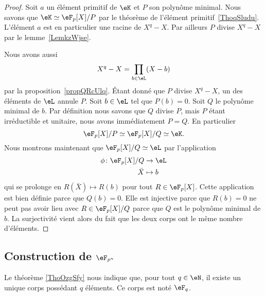 \begin{proof}
	Soit \( a\) un élément primitif de \( \eK\) et \( P\) son polynôme minimal. Nous savons que \( \eK\simeq \eF_p[X]/P\) par le théorème de l'élément primitif~\ref{ThoqSludu}. L'élément \( a\) est en particulier une racine de \( X^q-X\). Par ailleurs \( P\) divise \( X^q-X\) par le lemme~\ref{LemkzWjse}.

	Nous avons aussi
	\begin{equation}
		X^q-X=\prod_{b\in \eL}(X-b)
	\end{equation}
	par la proposition~\ref{propQRcUlq}. Étant donné que \( P\) divise \( X^q-X\), un des éléments de \( \eL\) annule \( P\). Soit \( b\in \eL\) tel que \( P(b)=0\). Soit \( Q\) le polynôme minimal de \( b\). Par définition nous savons que \( Q\) divise \( P\), mais \( P\) étant irréductible et unitaire, nous avons immédiatement \( P=Q\). En particulier
	\begin{equation}
		\eF_p[X]/P\simeq\eF_p[X]/Q\simeq \eK.
	\end{equation}
	Nous montrons maintenant que \( \eF_p[X]/Q\simeq \eL\) par l'application
	\begin{equation}
		\begin{aligned}
			\phi\colon \eF_p[X]/Q & \to \eL   \\
			\bar X                & \mapsto b
		\end{aligned}
	\end{equation}
	qui se prolonge en \( R(\bar X)\mapsto R(b)\) pour tout \( R\in \eF_p[X]\). Cette application est bien définie parce que \( Q(b)=0\). Elle est injective parce que \( R(b)=0\) ne peut pas avoir lieu avec \( R\in \eF_p[X]/Q\) parce que \( Q\) est le polynôme minimal de \( b\). La surjectivité vient alors du fait que les deux corps ont le même nombre d'éléments.
\end{proof}

\subsection{Construction de \( \eF_{p^n}\)}

Le théorème \ref{ThoOzgSfy} nous indique que, pour tout \( q\in \eN\), il existe un unique corps possédant \( q\) éléments. Ce corps est noté \( \eF_{q}\).

